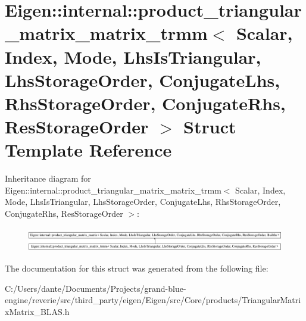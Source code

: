 \hypertarget{struct_eigen_1_1internal_1_1product__triangular__matrix__matrix__trmm}{}\section{Eigen\+::internal\+::product\+\_\+triangular\+\_\+matrix\+\_\+matrix\+\_\+trmm$<$ Scalar, Index, Mode, Lhs\+Is\+Triangular, Lhs\+Storage\+Order, Conjugate\+Lhs, Rhs\+Storage\+Order, Conjugate\+Rhs, Res\+Storage\+Order $>$ Struct Template Reference}
\label{struct_eigen_1_1internal_1_1product__triangular__matrix__matrix__trmm}
Inheritance diagram for Eigen\+::internal\+::product\+\_\+triangular\+\_\+matrix\+\_\+matrix\+\_\+trmm$<$ Scalar, Index, Mode, Lhs\+Is\+Triangular, Lhs\+Storage\+Order, Conjugate\+Lhs, Rhs\+Storage\+Order, Conjugate\+Rhs, Res\+Storage\+Order $>$\+:\begin{figure}[H]
\begin{center}
\leavevmode
\includegraphics[height=1.050657cm]{struct_eigen_1_1internal_1_1product__triangular__matrix__matrix__trmm}
\end{center}
\end{figure}


The documentation for this struct was generated from the following file\+:\begin{DoxyCompactItemize}
\item 
C\+:/\+Users/dante/\+Documents/\+Projects/grand-\/blue-\/engine/reverie/src/third\+\_\+party/eigen/\+Eigen/src/\+Core/products/Triangular\+Matrix\+Matrix\+\_\+\+B\+L\+A\+S.\+h\end{DoxyCompactItemize}
